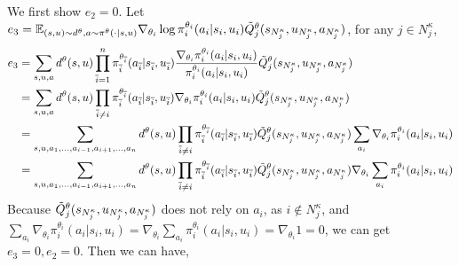 \documentclass[conf]{new-aiaa}
\begin{document}
We first show $e_2 = 0$. Let $e_3 = \mathbb{E}_{(s,u) \sim d^\theta, a \sim \pi^\theta(\cdot |s,u)} \nabla_{\theta_i} \log \pi_i^{\theta_i} (a_i|s_i,u_i) \Tilde{Q}_j^\theta(s_{N_j^\kappa}, u_{N_j^\kappa}, a_{N_j^\kappa})$, for any $j \in N_j^\kappa$,
\begin{equation}
\begin{aligned}
    e_3 &= \sum_{s, u, a} d^\theta(s, u) \prod_{\overline{i}=1}^n \pi_{\overline{i}}^{\theta_{\overline{i}}}(a_{\overline{i}} | s_{\overline{i}}, u_{\overline{i}}) \frac{\nabla_{\theta_i} \pi_i^{\theta_i} (a_i|s_i, u_i)}{\pi_i^{\theta_i} (a_i|s_i, u_i)}  \Tilde{Q}_j^\theta(s_{N_j^\kappa}, u_{N_j^\kappa}, a_{N_j^\kappa}) \\
    &= \sum_{s, u, a} d^\theta(s, u) \prod_{\overline{i} \ne i} \pi_{\overline{i}}^{\theta_{\overline{i}}}(a_{\overline{i}} | s_{\overline{i}}, u_{\overline{i}}) \nabla_{\theta_i} \pi_i^{\theta_i} (a_i|s_i, u_i) \Tilde{Q}_j^\theta(s_{N_j^\kappa}, u_{N_j^\kappa}, a_{N_j^\kappa}) \\
    &= \sum_{s,u,a_1, \dots, a_{i-1}, a_{i+1}, \dots, a_n} d^\theta(s,u ) \prod_{\overline{i} \ne i} \pi_{\overline{i}}^{\theta_{\overline{i}}}(a_{\overline{i}} | s_{\overline{i}}, u_{\overline{i}}) \Tilde{Q}_j^\theta(s_{N_j^\kappa}, u_{N_j^\kappa}, a_{N_j^\kappa}) \sum_{a_i} \nabla_{\theta_i} \pi_i^{\theta_i} (a_i|s_i, u_i) \\
    &= \sum_{s,u,a_1, \dots, a_{i-1}, a_{i+1}, \dots, a_n} d^\theta(s,u ) \prod_{\overline{i} \ne i} \pi_{\overline{i}}^{\theta_{\overline{i}}}(a_{\overline{i}} | s_{\overline{i}}, u_{\overline{i}})   \Tilde{Q}_j^\theta(s_{N_j^\kappa}, u_{N_j^\kappa}, a_{N_j^\kappa}) \nabla_{\theta_i} \sum_{a_i}  \pi_i^{\theta_i} (a_i|s_i, u_i)\\
\end{aligned}
\end{equation}
Because $\Tilde{Q}_j^\theta(s_{N_j^\kappa}, u_{N_j^\kappa}, a_{N_j^\kappa})$ does not rely on $a_i$, as $i \notin N_j^\kappa$, and $\sum_{a_i} \nabla_{\theta_i} \pi_i^{\theta_i} (a_i|s_i, u_i) = \nabla_{\theta_i} \sum_{a_i}  \pi_i^{\theta_i} (a_i|s_i, u_i) =\nabla_{\theta_i} 1 = 0$, we can get $e_3 = 0, e_2 = 0$. Then we can have,
\end{document}
